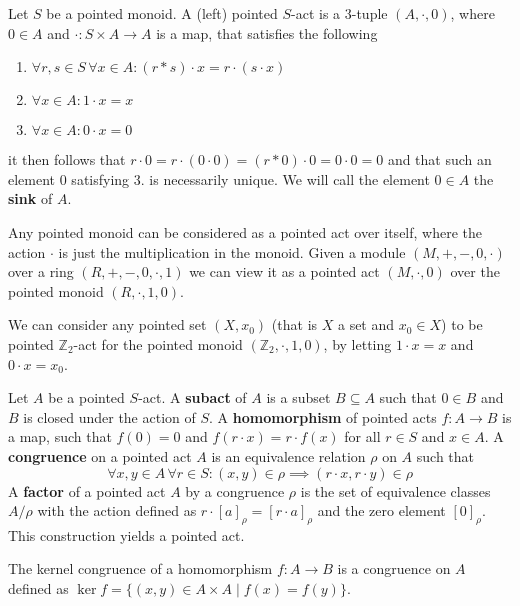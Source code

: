 \begin{definition}
    Let $S$ be a pointed monoid. A (left) pointed $S$-act is a $3$-tuple $(A,\cdot, 0)$, where $0\in A$ and $\cdot: S\times A \to A$ 
    is a map, that satisfies the following
    \begin{enumerate}
        \item $\forall r,s\in S\, \forall x\in A : (r\ast s)\cdot x = r\cdot(s\cdot x)$
        \item $\forall x\in A : 1\cdot x = x$
        \item $\forall x\in A : 0\cdot x = 0$
    \end{enumerate}
    it then follows that $r\cdot 0 = r\cdot (0\cdot 0) = (r\ast 0)\cdot 0 = 0\cdot 0 = 0$ and that 
    such an element $0$ satisfying $3.$ is necessarily unique. We will call the element $0\in A$ the 
    \textbf{sink} of $A$.
\end{definition}
\begin{example}
    Any pointed monoid can be considered as a pointed act over itself, where the action $\cdot$ is just the multiplication in the monoid. 
    Given a module $(M,+,-,0,\cdot)$ over a ring $(R,+,-,0,\cdot,1)$ we can view it as a pointed act $(M,\cdot,0)$ over the pointed monoid $(R,\cdot,1,0)$.
\end{example}
\begin{example}
    We can consider any pointed set $(X,x_0)$ (that is $X$ a set and $x_0\in X$) to be pointed $\mathbb{Z}_2$-act for the pointed monoid $(\mathbb{Z}_2,\cdot,1,0)$,
    by letting $1\cdot x = x$ and $0\cdot x = x_0$.
\end{example}
\begin{definition}
    Let $A$ be a pointed $S$-act. A \textbf{subact} of $A$ is a subset $B\subseteq A$ such that $0\in B$ and $B$ is closed under the action of $S$. 
    A \textbf{homomorphism} of pointed acts $f: A\to B$ is a map, such that $f(0) = 0$ and $f(r\cdot x) = r\cdot f(x)$ for all $r\in S$ and $x\in A$.
    A \textbf{congruence} on a pointed act $A$ is an equivalence relation $\rho$ on $A$ such that 
    \[
        \forall x,y\in A \,\forall r \in S: (x,y)\in\rho \implies (r\cdot x, r\cdot y)\in\rho
    \]
    A \textbf{factor} of a pointed act $A$ by a congruence $\rho$ is the set of equivalence classes $A/\rho$ with the action defined as $r \cdot [a]_\rho = [r \cdot a]_\rho$ and the zero element $[0]_\rho$. 
    This construction yields a pointed act.
\end{definition}
\begin{example}
    The kernel congruence of a homomorphism $f: A\to B$ is a congruence on $A$ defined as $\ker{f} = \{(x,y)\in A\times A \mid f(x) = f(y)\}$.
\end{example}
